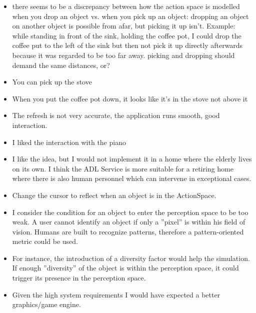 \begin{itemize}
	\item there seems to be a discrepancy between how the action space is modelled when you drop an object vs. when you pick up an object: dropping an object on another object is possible from afar, but picking it up isn't. Example: while standing in front of the sink, holding the coffee pot, I could drop the coffee put to the left of the sink but then not pick it up directly afterwards because it was regarded to be too far away. picking and dropping should demand the same distances, or?
	\item You can pick up the stove
	\item When you put the coffee pot down, it looks like it's in the stove not above it
	\item The refresh is not very accurate, the application runs smooth, good interaction.
	\item I liked the interaction with the piano
	\item I like the idea, but I would not implement it in a home where the elderly lives on its own. I think the ADL Service is more suitable for a retiring home where there is also human personnel which can intervene in exceptional cases.
	\item Change the cursor to reflect when an object is in the ActionSpace.
	\item I consider the condition for an object to enter the perception space to be too weak. A user cannot identify an object if only a ''pixel'' is within his field of vision. Humans are built to recognize patterns, therefore a pattern-oriented metric could be used.
	\item For instance, the introduction of a diversity factor would help the simulation. If enough ''diversity'' of the object is within the perception space, it could trigger its presence in the perception space.
	\item Given the high system requirements I would have expected a better graphics/game engine.
\end{itemize}

